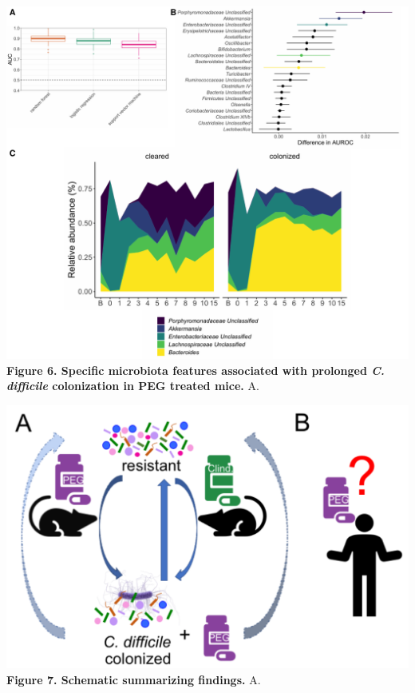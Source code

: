 \documentclass[
  11pt,
]{article}
\begin{document}
\newpage

\includegraphics{figure_6.pdf} \textbf{Figure 6. Specific microbiota
features associated with prolonged \emph{C. difficile} colonization in
PEG treated mice.} A. \newpage

\includegraphics{figure_7.pdf} \textbf{Figure 7. Schematic summarizing
findings.} A. \newpage
\end{document}
